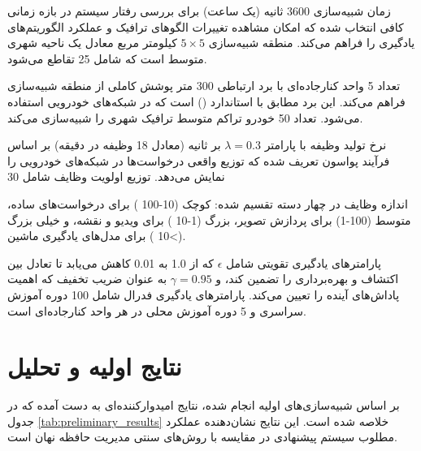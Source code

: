 \documentclass[11pt]{article}
\begin{document}
زمان شبیه‌سازی 3600 ثانیه (یک ساعت) برای بررسی رفتار سیستم در بازه زمانی کافی انتخاب شده که امکان مشاهده تغییرات الگوهای ترافیک و عملکرد الگوریتم‌های یادگیری را فراهم می‌کند. منطقه شبیه‌سازی $5 \times 5$ کیلومتر مربع معادل یک ناحیه شهری متوسط است که شامل 25 تقاطع می‌شود.

تعداد 5 واحد کنارجاده‌ای با برد ارتباطی 300 متر پوشش کاملی از منطقه شبیه‌سازی فراهم می‌کند. این برد مطابق با استاندارد  () است که در شبکه‌های خودرویی استفاده می‌شود. تعداد 50 خودرو تراکم متوسط ترافیک شهری را شبیه‌سازی می‌کند.

نرخ تولید وظیفه با پارامتر $\lambda = 0.3$ بر ثانیه (معادل 18 وظیفه در دقیقه) بر اساس فرآیند پواسون تعریف شده که توزیع واقعی درخواست‌ها در شبکه‌های خودرویی را نمایش می‌دهد. توزیع اولویت وظایف شامل 30%

اندازه وظایف در چهار دسته تقسیم شده: کوچک (10-100 ) برای درخواست‌های ساده، متوسط (100-1) برای پردازش تصویر، بزرگ (1-10 ) برای ویدیو و نقشه، و خیلی بزرگ (>10 ) برای مدل‌های یادگیری ماشین.

پارامترهای یادگیری تقویتی شامل $\epsilon$ که از 1.0 به 0.01 کاهش می‌یابد تا تعادل بین اکتشاف و بهره‌برداری را تضمین کند، و $\gamma = 0.95$ به عنوان ضریب تخفیف که اهمیت پاداش‌های آینده را تعیین می‌کند. پارامترهای یادگیری فدرال شامل 100 دوره آموزش سراسری و 5 دوره آموزش محلی در هر واحد کنارجاده‌ای است.

\section{نتایج اولیه و تحلیل}

بر اساس شبیه‌سازی‌های اولیه انجام شده، نتایج امیدوارکننده‌ای به دست آمده که در جدول \ref{tab:preliminary_results} خلاصه شده است. این نتایج نشان‌دهنده عملکرد مطلوب سیستم پیشنهادی در مقایسه با روش‌های سنتی مدیریت حافظه نهان است.
\end{document}
